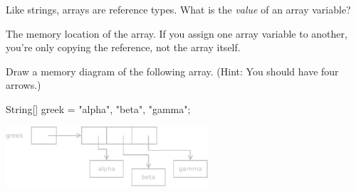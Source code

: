 \Q Like strings, arrays are reference types. What is the {\it value} of an array variable?

\begin{answer}
The memory location of the array. If you assign one array variable to another, you're only copying the reference, not the array itself.
\end{answer}


\Q Draw a memory diagram of the following array.
(Hint: You should have four arrows.)

\begin{javalst}
String[] greek = {"alpha", "beta", "gamma"};
\end{javalst}

\begin{answer}[5em]
\hspace{4em}
\includegraphics[height=6em]{string-array.pdf}
\end{answer}
